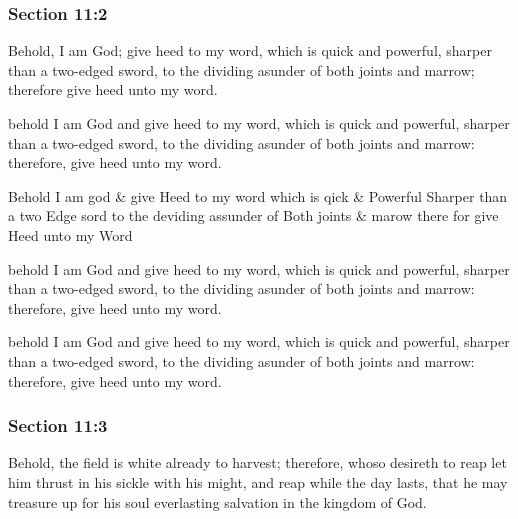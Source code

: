 	\subsubsection{Section 11:2} %
		\label{DC11-2}

		Behold, I am God; give heed to my word, which is quick and powerful, sharper than a two-edged sword, to the dividing asunder of both joints and marrow; therefore give heed unto my word.

		\begin{framed}
		\scriptsize
			\begin{compactdesc}
				\item[JSP] behold I am God and give heed to my word, which is quick and powerful, sharper than a two-edged sword, to the dividing asunder of both joints and marrow: therefore, give heed unto my word.
				\item[HS] Behold I am god \& give Heed to my word which is qick \& Powerful Sharper than a two Edge sord to the deviding assunder of Both joints \& marow there for give Heed unto my Word  
				\item[DC 1835] behold I am God and give heed to my word, which is quick and powerful, sharper than a two-edged sword, to the dividing asunder of both joints and marrow: therefore, give heed unto my word.
				\item[DC 1844] behold I am God and give heed to my word, which is quick and powerful, sharper than a two-edged sword, to the dividing asunder of both joints and marrow: therefore, give heed unto my word.
			\end{compactdesc}
		\end{framed}

	\subsubsection{Section 11:3} %
		\label{DC11-3}

		Behold, the field is white already to harvest; therefore, whoso desireth to reap let him thrust in his sickle with his might, and reap while the day lasts, that he may treasure up for his soul everlasting salvation in the kingdom of God.

